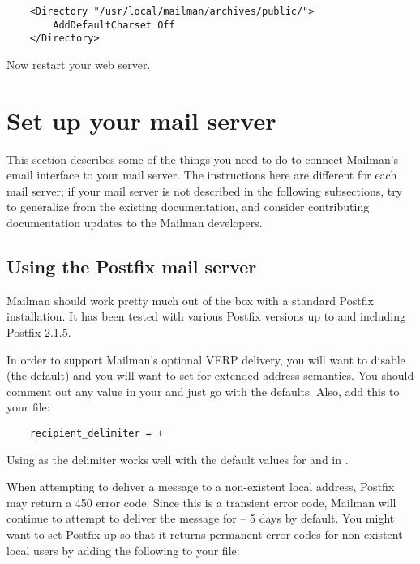 \documentclass{howto}
\begin{document}
\begin{verbatim}
    <Directory "/usr/local/mailman/archives/public/">
        AddDefaultCharset Off
    </Directory>
\end{verbatim}

Now restart your web server.

\section{Set up your mail server\label{mail-server}}

This section describes some of the things you need to do to connect Mailman's
email interface to your mail server.  The instructions here are different for
each mail server; if your mail server is not described in the following
subsections, try to generalize from the existing documentation, and consider
contributing documentation updates to the Mailman developers.

\subsection{Using the Postfix mail server}

Mailman should work pretty much out of the box with a standard Postfix
installation.  It has been tested with various Postfix versions up to and
including Postfix 2.1.5.

In order to support Mailman's optional VERP delivery, you will want to disable
 (the default) and you will want to set
 for extended address semantics.  You should comment
out any  value in your  and just go with the
defaults.  Also, add this to your  file:

\begin{verbatim}
    recipient_delimiter = +
\end{verbatim}

Using \samp{+} as the delimiter works well with the default values for
 and  in .

When attempting to deliver a message to a non-existent local address, Postfix
may return a 450 error code.  Since this is a transient error code, Mailman
will continue to attempt to deliver the message for
 -- 5 days by default.  You might want to set
Postfix up so that it returns permanent error codes for non-existent local
users by adding the following to your  file:
\end{document}
